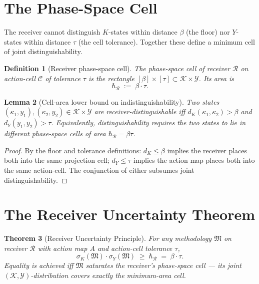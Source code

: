 \documentclass[twocolumn,11pt,a4paper]{article}
\newtheorem{theorem}{Theorem}[section]
\newtheorem{lemma}[theorem]{Lemma}
\newtheorem{definition}[theorem]{Definition}
\newcommand{\Action}{\mathcal{Y}}
\newcommand{\Knowl}{\mathcal{K}}
\newcommand{\Cell}{\mathcal{C}}
\newcommand{\Method}{\mathfrak{M}}
\newcommand{\receiver}{\mathcal{R}}
\newcommand{\hbarR}{\hbar_{\receiver}}
\newcommand{\disp}{\sigma}
\begin{document}
\section{The Phase-Space Cell}

The receiver cannot distinguish $K$-states within distance $\beta$ (the floor) nor $Y$-states within distance $\tau$ (the cell tolerance). Together these define a minimum cell of joint distinguishability.

\begin{definition}[Receiver phase-space cell]
\label{def:phase-cell}
The \emph{phase-space cell} of receiver $\receiver$ on action-cell $\Cell$ of tolerance $\tau$ is the rectangle $[\beta] \times [\tau] \subset \Knowl \times \Action$. Its area is
\[
\hbarR \;:=\; \beta \cdot \tau.
\]
\end{definition}

\begin{lemma}[Cell-area lower bound on indistinguishability]
\label{lem:cell-area}
Two states $(\kappa_1, y_1), (\kappa_2, y_2) \in \Knowl \times \Action$ are receiver-distinguishable iff $d_K(\kappa_1, \kappa_2) > \beta$ \emph{and} $d_Y(y_1, y_2) > \tau$. Equivalently, distinguishability requires the two states to lie in different phase-space cells of area $\hbarR = \beta \tau$.
\end{lemma}

\begin{proof}
By the floor and tolerance definitions: $d_K \leq \beta$ implies the receiver places both into the same projection cell; $d_Y \leq \tau$ implies the action map places both into the same action-cell. The conjunction of either subsumes joint distinguishability.
\end{proof}

\section{The Receiver Uncertainty Theorem}
\label{sec:uncertainty}

\begin{theorem}[Receiver Uncertainty Principle]
\label{thm:uncertainty}
For any methodology $\Method$ on receiver $\receiver$ with action map $A$ and action-cell tolerance $\tau$,
\[
\disp_K(\Method) \cdot \disp_Y(\Method) \;\geq\; \hbarR \;=\; \beta \cdot \tau.
\]
Equality is achieved iff $\Method$ saturates the receiver's phase-space cell — its joint $(\Knowl, \Action)$-distribution covers exactly the minimum-area cell.
\end{theorem}
\end{document}

